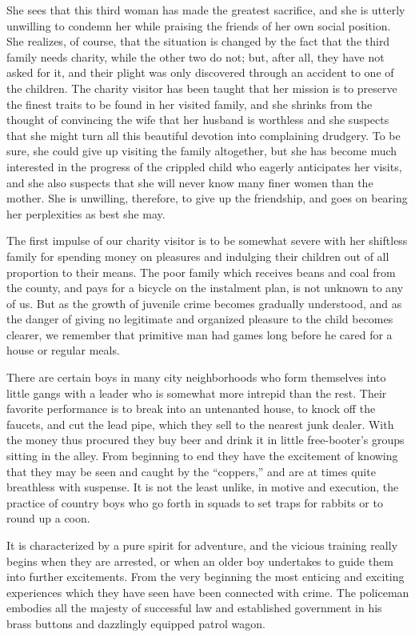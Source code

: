 \documentclass[]{article}
\begin{document}
\begin{sectionbody}
\addamsparagraph She sees that this third woman has made the greatest sacrifice, and she
is utterly unwilling to condemn her while praising the friends of her
own social position. She realizes, of course, that the situation is
changed by the fact that the third family needs charity, while the other
two do not; but, after all, they have not asked for it, and their plight
was only discovered through an accident to one of the children. The
charity visitor has been taught that her mission is to preserve the
finest traits to be found in her visited family, and she shrinks from
the thought of convincing the wife that her husband is worthless and she
suspects that she might turn all this beautiful devotion into
complaining drudgery. To be sure, she could give up visiting the family
altogether, but she has become much interested in the progress of the
crippled child who eagerly anticipates her visits, and she also suspects
that she will never know many finer women than the mother. She is
unwilling, therefore, to give up the friendship, and goes on bearing her
perplexities as best she may.

\addamsparagraph The first impulse of our charity visitor is to be somewhat severe with
her shiftless family for spending money on pleasures and indulging their
children out of all proportion to their means. The poor family which
receives beans and coal from the county, and pays for a bicycle on the
instalment plan, is not unknown to any of us. But as the growth of
juvenile crime becomes gradually understood, and as the danger of giving
no legitimate and organized pleasure to the child becomes clearer, we
remember that primitive man had games long before he cared for a house
or regular meals.

\addamsparagraph There are certain boys in many city neighborhoods who form themselves
into little gangs with a leader who is somewhat more intrepid than the
rest. Their favorite performance is to break into an untenanted house,
to knock off the faucets, and cut the lead pipe, which they sell to the
nearest junk dealer. With the money thus procured they buy beer and
drink it in little free-booter's groups sitting in the alley. From
beginning to end they have the excitement of knowing that they may be
seen and caught by the ``coppers,'' and are at times quite breathless with
suspense. It is not the least unlike, in motive and execution, the
practice of country boys who go forth in squads to set traps for rabbits
or to round up a coon.

\addamsparagraph It is characterized by a pure spirit for adventure, and the vicious
training really begins when they are arrested, or when an older boy
undertakes to guide them into further excitements. From the very
beginning the most enticing and exciting experiences which they have
seen have been connected with crime. The policeman embodies all the
majesty of successful law and established government in his brass
buttons and dazzlingly equipped patrol wagon.


\end{sectionbody}
\end{document}
